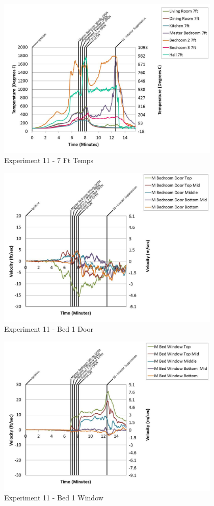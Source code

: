\documentclass{article}
\begin{document}
\begin{appendices}
	\begin{figure}[h!]
		\centering
		\includegraphics[height=3.05in]{0_Images/Results_Charts/Exp_11_Charts/7FtTemps.pdf}
		\caption{Experiment 11 - 7 Ft Temps}
	\end{figure}
 
	\clearpage

	\begin{figure}[h!]
		\centering
		\includegraphics[height=3.05in]{0_Images/Results_Charts/Exp_11_Charts/Bed1Door.pdf}
		\caption{Experiment 11 - Bed 1 Door}
	\end{figure}
 

	\begin{figure}[h!]
		\centering
		\includegraphics[height=3.05in]{0_Images/Results_Charts/Exp_11_Charts/Bed1Window.pdf}
		\caption{Experiment 11 - Bed 1 Window}
	\end{figure}
 

\end{appendices}
\end{document}

